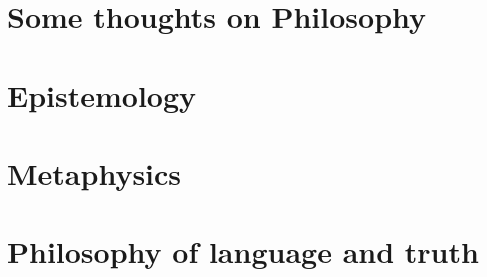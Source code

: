 \chapter{Some thoughts on Philosophy}

\chapter{Epistemology}
\chapter{Metaphysics}
\chapter{Philosophy of language and truth}